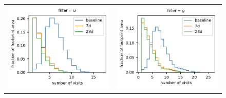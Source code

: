 \documentclass[preprintm,linenumbers]{aastex631}
\begin{document}
		\begin{figure}
			\centering
			\begin{tabular}{@{}c@{}c@{}}
			
    				\includegraphics{results/histograms/hist_first_year_one_snap_v4_0_10yrs_db_noDD_noTwi_CountMetric_doAllTemplateMetrics_reduceCount_u_noDD_noTwi.pdf} &
				\includegraphics{results/histograms/hist_first_year_one_snap_v4_0_10yrs_db_noDD_noTwi_CountMetric_doAllTemplateMetrics_reduceCount_g_noDD_noTwi.pdf} \\

\end{tabular}
\end{figure}
\end{document}
